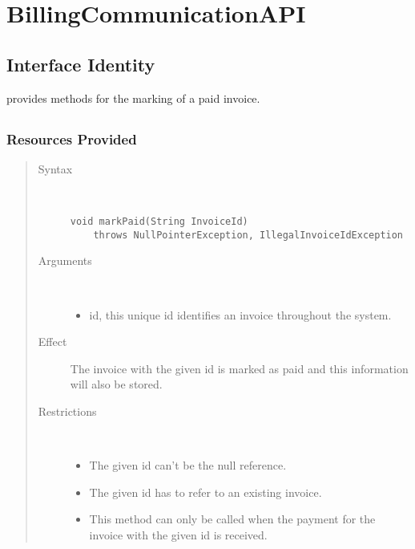 \section{BillingCommunicationAPI}
\label{api:billing-communication-api}

\subsection{Interface Identity}

\npar {} provides methods for the marking of a
paid invoice.

\subsection{}

\subsubsection{Resources Provided}

\begin{quote}
	\begin{description}
		\item[Syntax] \
		\begin{verbatim}
void markPaid(String InvoiceId)
    throws NullPointerException, IllegalInvoiceIdException
		\end{verbatim}
		\item[Arguments] \
		\begin{itemize}
		  \item id, this unique id identifies an invoice throughout the system.
		\end{itemize}
		\item[Effect] The invoice with the given id is marked as paid and this
		information will also be stored. 
		\item[Restrictions] \
		\begin{itemize}
		  \item The given id can't be the null reference.
		  \item The given id has to refer to an existing invoice.
		  \item This method can only be called when the payment for the invoice with
		  the given id is received.
		\end{itemize}
	\end{description} 
\end{quote}

